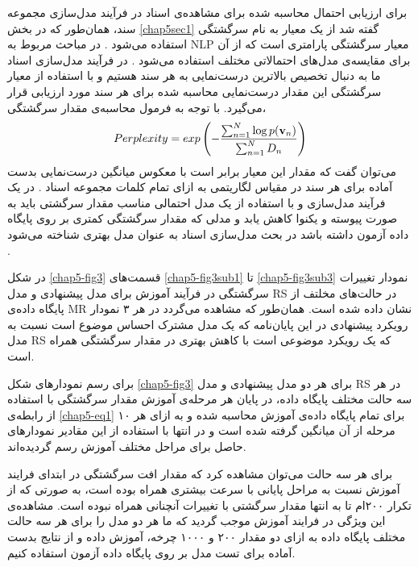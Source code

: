 برای ارزیابی احتمال محاسبه شده برای مشاهده‌ی اسناد در فرآیند مدل‌سازی مجموعه سند، همان‌طور که در بخش 
\ref{chap5sec1}
گفته شد از یک معیار به نام سرگشتگی استفاده می‌‌شود
\cite{blei2003latent}.
در مباحث مربوط به 
NLP
معیار سرگشتگی پارامتری است که از آن برای مقایسه‌ی مدل‌های احتمالاتی مختلف استفاده می‌شود
\cite{blei2003latent}.
 در فرآیند مدل‌سازی اسناد ما به دنبال تخصیص بالاترین درست‌نمایی به هر سند هستیم و با استفاده از معیار سرگشتگی این مقدار درست‌نمایی 
 محاسبه ‌شده برای هر سند مورد ارزیابی قرار می‌‌گیرد. با توجه به فرمول محاسبه‌ی مقدار سرگشتگی،
\begin{align}
	\centering
	\label{chap5-eq1}
	Perplexity = exp\left( - \dfrac{\sum_{n=1}^{N}\log p(\textbf{v}_n)}{\sum_{n=1}^{N}D_n} \right)
\end{align}
می‌‌توان گفت که مقدار این معیار برابر است با معکوس میانگین درست‌نمایی بدست آماده برای هر سند در مقیاس لگاریتمی به ازای تمام کلمات مجموعه اسناد
\cite{blei2003latent}.
 در یک فرآیند مدل‌سازی و با استفاده از یک مدل احتمالی‌ مناسب مقدار سرگشتی باید به صورت پیوسته و یکنوا کاهش یابد و مدلی که مقدار سرگشتگی کمتری بر روی پایگاه داده آزمون داشته باشد در بحث مدل‌سازی اسناد به عنوان مدل بهتری شناخته می‌‌شود
\cite{blei2003latent}.


در شکل 
\ref{chap5-fig3}
قسمت‌های
\ref{chap5-fig3sub1}
 تا
 \ref{chap5-fig3sub3}
  نمودار تغییرات سرگشتگی در فرآیند آموزش برای مدل پیشنهادی و مدل 
RS
در حالت‌های مخلتف از پایگاه داده‌ی 
MR
نشان داده شده است. همان‌طور که مشاهده می‌‌گردد در هر ۳ نمودار رویکرد پیشنهادی در این پایان‌‌نامه که یک مدل مشترک احساس موضوع است نسبت به مدل 
RS
که یک رویکرد موضوعی است با کاهش بهتری در مقدار سرگشتگی همراه است. 

برای رسم نمودارهای شکل
\ref{chap5-fig3}
برای هر دو مدل پیشنهادی و مدل
RS
در هر سه‌ حالت مختلف پایگاه داده، در پایان هر مرحله‌ی آموزش مقدار سرگشتگی با استفاده از رابطه‌ی
\ref{chap5-eq1}
برای تمام پایگاه داده‌ی ‌آموزش محاسبه شده و به ازای هر ۱۰ مرحله از آن میانگین گرفته شده است و در انتها با استفاده از این مقادیر نمودارهای حاصل برای مراحل مختلف آموزش رسم گردیده‌اند.

برای هر سه حالت می‌‌توان مشاهده کرد که مقدار افت سرگشتگی در ابتدای فرایند آموزش نسبت به مراحل پایانی با سرعت بیشتری همراه بوده است، به صورتی‌ که از تکرار ۲۰۰ام تا به انتها مقدار سرگشتی با تغییرات آنچنانی همراه نبوده است. مشاهده‌ی این ویژگی‌ در فرایند آموزش موجب گردید که ما هر دو مدل را برای هر سه حالت مختلف پایگاه داده به ازای دو مقدار ۲۰۰ و ۱۰۰۰ چرخه‌، آموزش داده و از نتایج بدست آماده برای تست مدل بر روی پایگاه داده آزمون استفاده کنیم. 

